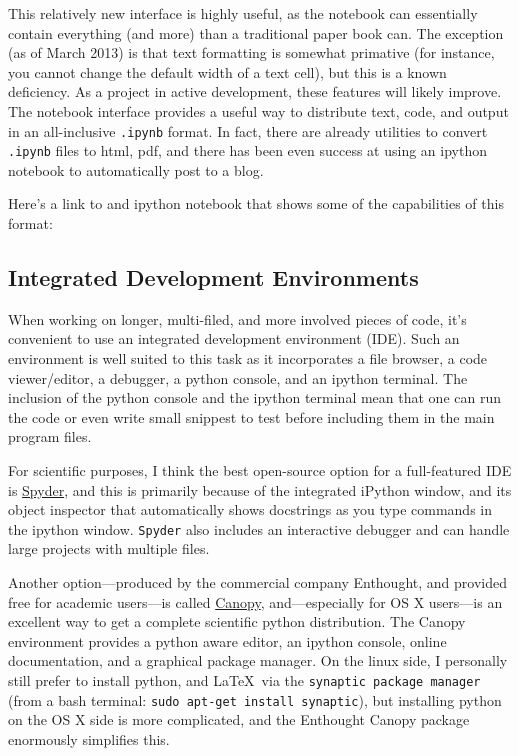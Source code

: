 This relatively new interface is highly useful, as the notebook can essentially contain everything (and more) than 
a traditional paper book can. The exception (as of March 2013) is that text formatting is somewhat primative (for instance, you cannot change the default width of a text cell), but this is a known deficiency. As a project in active development, these features will likely improve. The notebook interface provides a useful way to distribute text, code, and output in an 
all-inclusive \texttt{.ipynb} format. In fact, there are already utilities to convert \texttt{.ipynb} files to html, pdf, and there has been even success at using an ipython notebook to automatically post to a blog. 

Here's a link to and ipython notebook that shows some of the capabilities of this format: 

\subsection{Integrated Development Environments }
\label{sec:pythonIDEs}

When working on longer, multi-filed, and more involved pieces of code, it's convenient to use an integrated development environment (IDE). Such an environment is well suited to this task as it incorporates a file browser, a code viewer/editor, a debugger, a python console, and an ipython terminal. The inclusion of the python console and the ipython terminal mean that one can run the code or even write small snippest to test before including them in the main program files. 

For scientific purposes, I think the best open-source option for a full-featured IDE is \href{https://code.google.com/p/spyderlib/}
{Spyder}, and this is primarily because of the integrated iPython window, and its object inspector that automatically shows docstrings as you type commands in the ipython window. \texttt{Spyder} also includes an interactive debugger and can handle large projects with multiple files.  

Another option---produced by the commercial company Enthought, and provided free for academic users---is called \href{https://www.enthought.com/products/canopy/}{Canopy}, and---especially for OS X users---is an excellent way to get a complete scientific python distribution. The Canopy environment provides a python aware editor, an ipython console, online documentation, and a graphical package manager. On the linux side, I personally still prefer to install python, and \LaTeX\ 
via the \texttt{synaptic package manager} (from a bash terminal: \texttt{sudo apt-get install synaptic}), but installing python on the OS X side is more complicated, and the Enthought Canopy package enormously simplifies this. 

